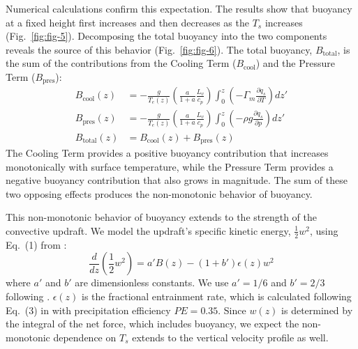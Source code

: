 \documentclass[draft]{ametsocV6.1}
\begin{document}
Numerical calculations confirm this expectation. The results show that buoyancy at a fixed height first increases and then decreases as the $T_s$ increases (Fig.~\ref{fig:fig-5}). Decomposing the total buoyancy into the two components reveals the source of this behavior (Fig.~\ref{fig:fig-6}). The total buoyancy, $B_{\text{total}}$, is the sum of the contributions from the Cooling Term ($B_{\text{cool}}$) and the Pressure Term ($B_{\text{pres}}$):
\begin{align}
B_{\text{cool}}(z) &= -\frac{g}{T_e(z)} \left( \frac{a}{1+a} \frac{L_v}{c_p} \right) \int_0^z \left(-\Gamma_m \frac{\partial q_s}{\partial T}\right) dz' \label{eq:b_cool} \\
B_{\text{pres}}(z) &= -\frac{g}{T_e(z)} \left( \frac{a}{1+a} \frac{L_v}{c_p} \right) \int_0^z \left(-\rho g \frac{\partial q_s}{\partial p}\right) dz' \label{eq:b_pres} \\
B_{\text{total}}(z) &= B_{\text{cool}}(z) + B_{\text{pres}}(z) \label{eq:b_total}
\end{align}
The Cooling Term provides a positive buoyancy contribution that increases monotonically with surface temperature, while the Pressure Term provides a negative buoyancy contribution that also grows in magnitude. The sum of these two opposing effects produces the non-monotonic behavior of buoyancy.

This non-monotonic behavior of buoyancy extends to the strength of the convective updraft. We model the updraft's specific kinetic energy, $\frac{1}{2}w^2$, using Eq.~(1) from \cite{delgenio2007}:
\begin{equation}
\frac{d}{dz}\left(\frac{1}{2}w^2\right)=a'B(z)-(1+b')\epsilon(z)w^2 \label{eq:momentum}
\end{equation}
where $a'$ and $b'$ are dimensionless constants. We use $a'=1/6$ and $b'=2/3$ following \cite{delgenio2007}. $\epsilon(z)$ is the fractional entrainment rate, which is calculated following Eq.~(3) in \cite{romps2016} with precipitation efficiency $PE=0.35$. Since $w(z)$ is determined by the integral of the net force, which includes buoyancy, we expect the non-monotonic dependence on $T_s$ extends to the vertical velocity profile as well.
\end{document}
